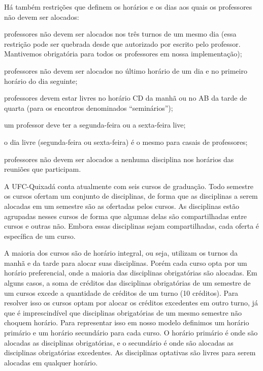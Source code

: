 Há também restrições que definem os horários e os dias aos quais os professores não devem ser alocados:

\begin{alineascomponto}
\item professores não devem ser alocados nos três turnos de um mesmo dia (essa restrição pode ser quebrada desde que autorizado por escrito pelo professor. Mantivemos obrigatória para todos os professores em nossa implementação);
\item professores não devem ser alocados no último horário de um dia e no primeiro horário do dia seguinte;
\item professores devem estar livres no horário CD da manhã ou no AB da tarde de quarta (para os encontros denominados ``seminários'');
\item um professor deve ter a segunda-feira ou a sexta-feira live;
\item o dia livre (segunda-feira ou sexta-feira) é o mesmo para casais de professores;
\item professores não devem ser alocados a nenhuma disciplina nos horários das reuniões que participam.
\end{alineascomponto}

A UFC-Quixadá conta atualmente com seis cursos de graduação. Todo semestre os cursos ofertam um conjunto de disciplinas, de forma que as disciplinas a serem alocadas em um semestre são as ofertadas pelos cursos. As disciplinas estão agrupadas nesses cursos de forma que algumas delas são compartilhadas entre cursos e outras não. Embora essas disciplinas sejam compartilhadas, cada oferta é específica de um curso. 

A maioria dos cursos são de horário integral, ou seja, utilizam os turnos da manhã e da tarde para alocar suas disciplinas. Porém cada curso opta por um horário preferencial, onde a maioria das disciplinas obrigatórias são alocadas. Em alguns casos, a soma de créditos das disciplinas obrigatórias de um semestre de um cursos excede a quantidade de créditos de um turno (10 créditos). Para resolver isso os cursos optam por alocar os créditos excedentes em outro turno, já que é imprescindível que disciplinas obrigatórias de um mesmo semestre não choquem horário. Para representar isso em nosso modelo definimos um horário primário e um horário secundário para cada curso. O horário primário é onde são alocadas as disciplinas obrigatórias, e o secundário é onde são alocadas as disciplinas obrigatórias excedentes. As disciplinas optativas são livres para serem alocadas em qualquer horário.

